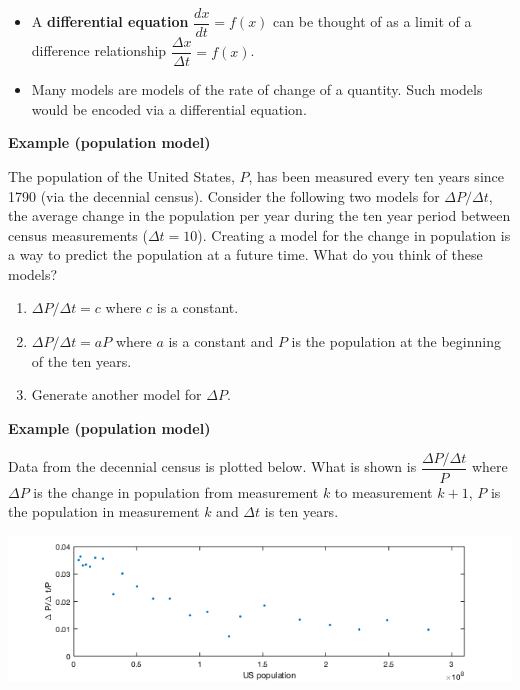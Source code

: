 \documentclass[12pt,letterpaper,noanswers]{exam}
\begin{document}
\begin{tcolorbox}
\begin{itemize}
\itemsep0em
    \item A \textbf{differential equation} $\dfrac{dx}{dt} = f(x)$ can be thought of as a limit of a difference relationship $\dfrac{\Delta x}{\Delta t} = f(x)$.
    \item Many models are models of the rate of change of a quantity.  Such models would be encoded via a differential equation.
\end{itemize}
\end{tcolorbox}


\noindent\textbf{Example (population model)}

The population of the United States, $P$, has been measured every ten years since 1790 (via the decennial census).  Consider the following two models for $\Delta P/\Delta t$, the average change in the population per year during the ten year period between census measurements ($\Delta t = 10$).  Creating a model for the change in population is a way to predict the population at a future time.  What do you think of these models?  
\begin{enumerate}
\itemsep2em
    \item $\Delta P/\Delta t = c$ where $c$ is a constant.
    \item $\Delta P/\Delta t = a P$ where $a$ is a constant and $P$ is the population at the beginning of the ten years.
    \item Generate another model for $\Delta P$.
\end{enumerate}
\vspace{0.7in}


\noindent\textbf{Example (population model)}

Data from the decennial census is plotted below.  What is shown is $\dfrac{\Delta P/\Delta t}{P}$ where $\Delta P$ is the change in population from measurement $k$ to measurement $k+1$, $P$ is the population in measurement $k$ and $\Delta t$ is ten years.

\includegraphics[width=\textwidth]{img/C29dpdtoverpvsp.png}
\end{document}
